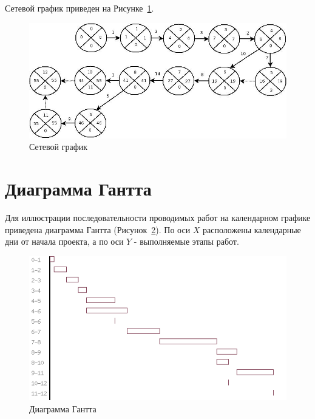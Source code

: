Сетевой график приведен на Рисунке~\ref{fig:netgraph}.
\begin{figure}
\caption{Сетевой график}
\label{fig:netgraph}
\centering
\includegraphics[scale=0.5]{pictures/netgraph}
\end{figure}

\section{Диаграмма Гантта}
Для иллюстрации последовательности проводимых работ на календарном графике приведена диаграмма Гантта (Рисунок~\ref{fig:econom_gant}). По оси $X$ расположены календарные дни от начала проекта, а по оси $Y$ - выполняемые этапы работ.
\begin{figure}
\caption{Диаграмма Гантта}
\label{fig:econom_gant}
\centering
\includegraphics[scale=0.7]{pictures/gantt}
\end{figure}

